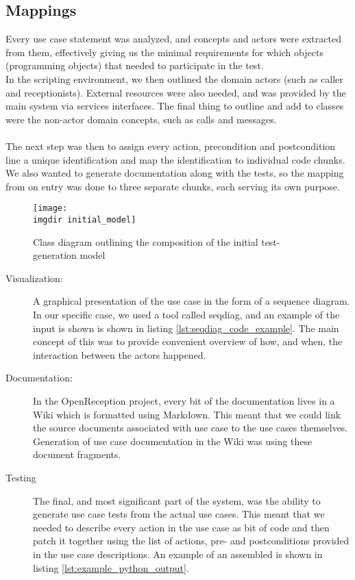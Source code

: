 \subsection{Mappings}
Every use case statement was analyzed, and concepts and actors were extracted from them, effectively giving us the minimal requirements for which objects (programming objects) that needed to participate in the test.\\
In the scripting environment, we then outlined the domain actors (such as caller and receptionists). External resources were also needed, and was provided by the main system via services interfaces. The final thing to outline and add to classes were the non-actor domain concepts, such as calls and messages.\\\\
The next step was then to assign every action, precondition and postcondition line a unique identification and map the identification to individual code chunks. We also wanted to generate documentation along with the tests, so the mapping from on entry was done to three separate chunks, each serving its own purpose.
\begin{figure}[!htbp]
\centering
\texttt{[image: \\imgdir initial\_model]}
\caption{Class diagram outlining the composition of the initial test-generation model}
\label{fig:first_generation_model}
\end{figure}
\begin{description}
  \item[Visualization:] A graphical presentation of the use case in the form of a sequence diagram. In our specific case, we used a tool called seqdiag, and an example of the input is shown is shown in listing \ref{lst:seqdiag_code_example}. The main concept of this was to provide convenient overview of how, and when, the interaction between the actors happened.
  \item[Documentation:] In the OpenReception project, every bit of the documentation lives in a Wiki which is formatted using Markdown. This meant that we could link the source documents associated with use case to the use cases themselves. Generation of use case documentation in the Wiki was using these document fragments.
  \item[Testing] The final, and most significant part of the system, was the ability to generate use case tests from the actual use cases. This meant that we needed to describe every action in the use case as bit of code and then patch it together using the list of actions, pre- and postconditions provided in the use case descriptions. An example of an assembled is shown in listing \ref{lst:example_python_output}.
\end{description}
